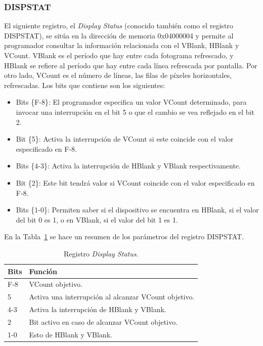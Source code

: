 \subsubsection{DISPSTAT}

El siguiente registro, el \textit{Display Status} (conocido también como el registro DISPSTAT), se sitúa en la dirección de memoria 0x04000004 y permite al programador consultar la información relacionada con el VBlank, HBlank y VCount. VBlank es el período que hay entre cada fotograma refrescado, y HBlank se refiere al período que hay entre cada línea refrescada por pantalla. Por otro lado, VCount es el número de líneas, las filas de píxeles horizontales, refrescadas. Los bits que contiene son los siguientes:
\begin{itemize}
	\item Bits \{F-8\}: El programador especifica un valor VCount determinado, para invocar una interrupción en el bit {5} o que el cambio se vea reflejado en el bit {2}.
	\item Bit \{5\}: Activa la interrupción de VCount si este coincide con el valor especificado en {F-8}.
	\item Bits \{4-3\}: Activa la interrupción de HBlank y VBlank respectivamente.
	\item Bit \{2\}: Este bit tendrá valor si VCount coincide con el valor especificado en {F-8}.
	\item Bits \{1-0\}: Permiten saber si el dispositivo se encuentra en HBlank, si el valor del bit 0 es 1, o en VBlank, si el valor del bit 1 es 1.
\end{itemize}

En la Tabla~\ref{tab:dispstat} se hace un resumen de los parámetros del registro DISPSTAT.

\begin{table}[h]
	\centering
	\begin{tabular}{| l | l |}
		\hline
		\textbf{Bits} & \textbf{Función}  \\ \hline
		F-8 & VCount objetivo.  \\ \hline
		5 & Activa una interrupción al alcanzar VCount objetivo. \\ \hline
		4-3 & Activa la interrupción de HBlank y VBlank. \\ \hline
		2 & Bit activo en caso de alcanzar VCount objetivo.  \\ \hline
		1-0 & Esto de HBlank y VBlank. \\ \hline
	\end{tabular}
	\caption{Registro \textit{Display Status}.}\label{tab:dispstat}
\end{table}
\FloatBarrier{}

